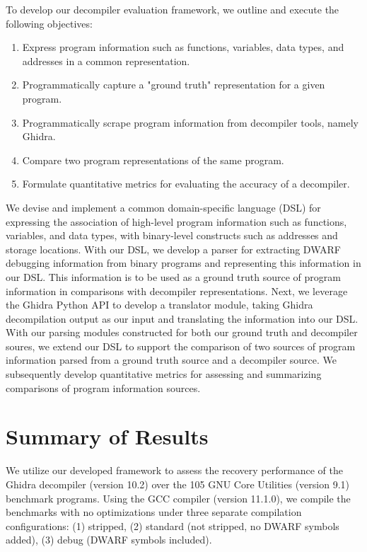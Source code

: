 To develop our decompiler evaluation framework, we outline and execute the following objectives:

\begin{enumerate}
    \item Express program information such as functions, variables, data types, and addresses in a common representation.
    \item Programmatically capture a "ground truth" representation for a given program.
    \item Programmatically scrape program information from decompiler tools, namely Ghidra.
    \item Compare two program representations of the same program.
    \item Formulate quantitative metrics for evaluating the accuracy of a decompiler.
\end{enumerate}

We devise and implement a common domain-specific language (DSL) for expressing the association of high-level program information such as functions, variables, and data types, with binary-level constructs such as addresses and storage locations. With our DSL, we develop a parser for extracting DWARF debugging information from binary programs and representing this information in our DSL. This information is to be used as a ground truth source of program information in comparisons with decompiler representations. Next, we leverage the Ghidra Python API to develop a translator module, taking Ghidra decompilation output as our input and translating the information into our DSL. With our parsing modules constructed for both our ground truth and decompiler soures, we extend our DSL to support the comparison of two sources of program information parsed from a ground truth source and a decompiler source. We subsequently develop quantitative metrics for assessing and summarizing comparisons of program information sources.

\section{Summary of Results}

We utilize our developed framework to assess the recovery performance of the Ghidra decompiler (version 10.2) over the 105 GNU Core Utilities (version 9.1) benchmark programs. Using the GCC compiler (version 11.1.0), we compile the benchmarks with no optimizations under three separate compilation configurations: (1) stripped, (2) standard (not stripped, no DWARF symbols added), (3) debug (DWARF symbols included).

